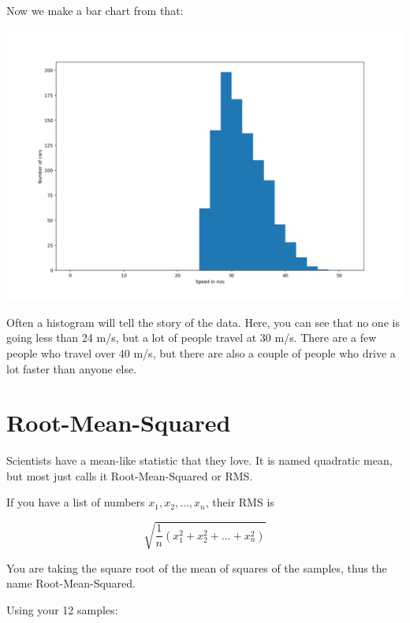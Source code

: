 Now we make a bar chart from that:

\includegraphics[width=\textwidth] {speed_histo.png}

Often a histogram will tell the story of the data. Here, you can see
that no one is going less than 24 m/s, but a lot of people travel at
30 m/s. There are a few people who travel over 40 m/s, but there are also a
couple of people who drive a lot faster than anyone else.

\section{Root-Mean-Squared}

Scientists have a mean-like statistic that they love. It is named
quadratic mean, but most just calls it Root-Mean-Squared or
RMS.

\begin{mdframed}[style=important, frametitle={Definition of RMS}]

If you have a list of numbers $x_1, x_2, \ldots, x_n$, their RMS
is   

$$\sqrt{\frac{1}{n}\left( x_1^2 + x_2^2 + \ldots + x_n^2 \right)}$$

\end{mdframed}

You are taking the square root of the mean of squares of the samples,
thus the name Root-Mean-Squared.

Using your 12 samples:

